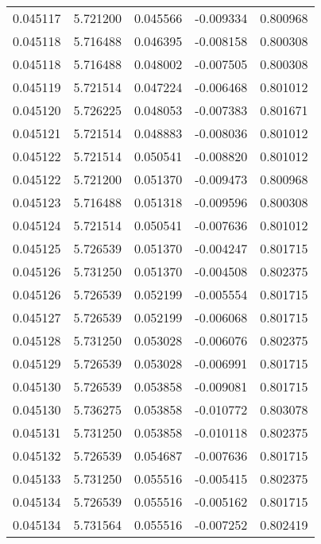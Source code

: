 \begin{tabular}{lrrrr}
0.045117    &  5.721200 &  0.045566 & -0.009334 &             0.800968 \\
0.045118    &  5.716488 &  0.046395 & -0.008158 &             0.800308 \\
0.045118    &  5.716488 &  0.048002 & -0.007505 &             0.800308 \\
0.045119    &  5.721514 &  0.047224 & -0.006468 &             0.801012 \\
0.045120    &  5.726225 &  0.048053 & -0.007383 &             0.801671 \\
0.045121    &  5.721514 &  0.048883 & -0.008036 &             0.801012 \\
0.045122    &  5.721514 &  0.050541 & -0.008820 &             0.801012 \\
0.045122    &  5.721200 &  0.051370 & -0.009473 &             0.800968 \\
0.045123    &  5.716488 &  0.051318 & -0.009596 &             0.800308 \\
0.045124    &  5.721514 &  0.050541 & -0.007636 &             0.801012 \\
0.045125    &  5.726539 &  0.051370 & -0.004247 &             0.801715 \\
0.045126    &  5.731250 &  0.051370 & -0.004508 &             0.802375 \\
0.045126    &  5.726539 &  0.052199 & -0.005554 &             0.801715 \\
0.045127    &  5.726539 &  0.052199 & -0.006068 &             0.801715 \\
0.045128    &  5.731250 &  0.053028 & -0.006076 &             0.802375 \\
0.045129    &  5.726539 &  0.053028 & -0.006991 &             0.801715 \\
0.045130    &  5.726539 &  0.053858 & -0.009081 &             0.801715 \\
0.045130    &  5.736275 &  0.053858 & -0.010772 &             0.803078 \\
0.045131    &  5.731250 &  0.053858 & -0.010118 &             0.802375 \\
0.045132    &  5.726539 &  0.054687 & -0.007636 &             0.801715 \\
0.045133    &  5.731250 &  0.055516 & -0.005415 &             0.802375 \\
0.045134    &  5.726539 &  0.055516 & -0.005162 &             0.801715 \\
0.045134    &  5.731564 &  0.055516 & -0.007252 &             0.802419 \\

\end{tabular}
